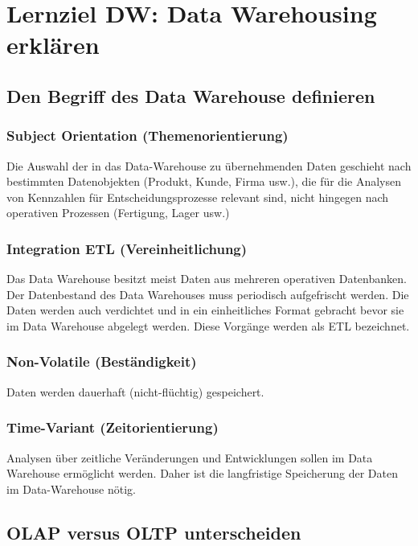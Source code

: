 \section{Lernziel DW: Data Warehousing erklären}

\subsection{Den Begriff des Data Warehouse definieren}

\subsubsection{Subject Orientation (Themenorientierung)}

Die Auswahl der in das Data-Warehouse zu übernehmenden Daten geschieht nach bestimmten Datenobjekten (Produkt, Kunde, Firma usw.), die für die Analysen von Kennzahlen für Entscheidungsprozesse relevant sind, nicht hingegen nach operativen Prozessen (Fertigung, Lager usw.)

\subsubsection{Integration ETL (Vereinheitlichung)}

Das Data Warehouse besitzt meist Daten aus mehreren operativen Datenbanken. Der Datenbestand des Data Warehouses muss periodisch aufgefrischt werden. Die Daten werden auch verdichtet und in ein einheitliches Format gebracht bevor sie im Data Warehouse abgelegt werden. Diese Vorgänge werden als \ac{ETL} bezeichnet.

\subsubsection{Non-Volatile (Beständigkeit)}

Daten werden dauerhaft (nicht-flüchtig) gespeichert.

\subsubsection{Time-Variant (Zeitorientierung)}

Analysen über zeitliche Veränderungen und Entwicklungen sollen im Data Warehouse ermöglicht werden. Daher ist die langfristige Speicherung der Daten im Data-Warehouse nötig.

\subsection{OLAP versus OLTP unterscheiden}

